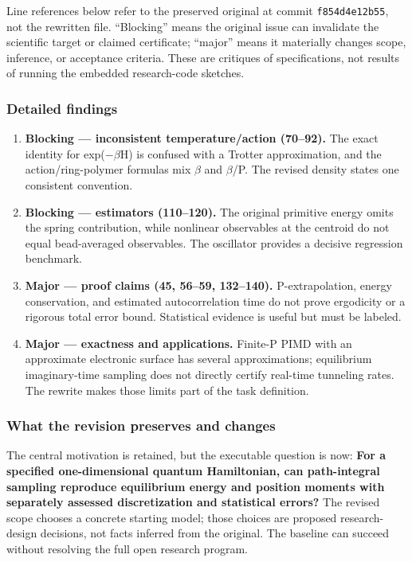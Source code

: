 \documentclass[
  11pt,
]{article}
\begin{document}
Line references below refer to the preserved original at commit
\texttt{f854d4e12b55}, not the rewritten file. ``Blocking'' means the
original issue can invalidate the scientific target or claimed
certificate; ``major'' means it materially changes scope, inference, or
acceptance criteria. These are critiques of specifications, not results
of running the embedded research-code sketches.

\subsubsection{Detailed findings}

\begin{enumerate}
\def\labelenumi{\arabic{enumi}.}
\item
  \textbf{Blocking --- inconsistent temperature/action (70--92).} The
  exact identity for exp(\ensuremath{-}\ensuremath{\beta}H) is confused
  with a Trotter approximation, and the action/ring-polymer formulas mix
  \ensuremath{\beta} and \ensuremath{\beta}/P. The revised density
  states one consistent convention.
\item
  \textbf{Blocking --- estimators (110--120).} The original primitive
  energy omits the spring contribution, while nonlinear observables at
  the centroid do not equal bead-averaged observables. The oscillator
  provides a decisive regression benchmark.
\item
  \textbf{Major --- proof claims (45, 56--59, 132--140).}
  P-extrapolation, energy conservation, and estimated autocorrelation
  time do not prove ergodicity or a rigorous total error bound.
  Statistical evidence is useful but must be labeled.
\item
  \textbf{Major --- exactness and applications.} Finite-P PIMD with an
  approximate electronic surface has several approximations; equilibrium
  imaginary-time sampling does not directly certify real-time tunneling
  rates. The rewrite makes those limits part of the task definition.
\end{enumerate}

\subsubsection{What the revision preserves and changes}

The central motivation is retained, but the executable question is now:
\textbf{For a specified one-dimensional quantum Hamiltonian, can
path-integral sampling reproduce equilibrium energy and position moments
with separately assessed discretization and statistical errors?} The
revised scope chooses a concrete starting model; those choices are
proposed research-design decisions, not facts inferred from the
original. The baseline can succeed without resolving the full open
research program.
\end{document}
